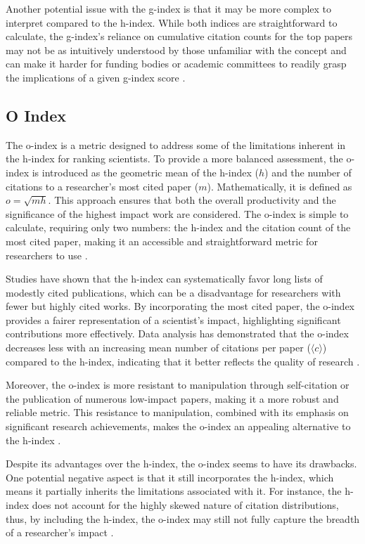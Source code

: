 Another potential issue with the g-index is that it may be more complex to
interpret compared to the h-index. While both indices are straightforward to
calculate, the g-index's reliance on cumulative citation counts for the top
papers may not be as intuitively understood by those unfamiliar with the
concept and can make it harder for funding bodies or academic committees to
readily grasp the implications of a given g-index score
\cite{egghe2008mathematical, egghe2006improvement}.

\subsection{O Index}
The o-index is a metric designed to address some of the limitations inherent in
the h-index for ranking scientists. To provide a more balanced assessment, the
o-index is introduced as the geometric mean of the h-index ($h$) and the number
of citations to a researcher's most cited paper ($m$). Mathematically, it is
defined as $o = \sqrt{mh}$. This approach ensures that both the overall
productivity and the significance of the highest impact work are considered.
The o-index is simple to calculate, requiring only two numbers: the h-index and
the citation count of the most cited paper, making it an accessible and
straightforward metric for researchers to use \cite{dorogovtsev2015ranking}.

Studies have shown that the h-index can systematically favor long lists of
modestly cited publications, which can be a disadvantage for researchers with
fewer but highly cited works. By incorporating the most cited paper, the
o-index provides a fairer representation of a scientist's impact, highlighting
significant contributions more effectively. Data analysis has demonstrated that
the o-index decreases less with an increasing mean number of citations per
paper ($\langle c \rangle$) compared to the h-index, indicating that it better
reflects the quality of research \cite{dorogovtsev2015ranking}.

Moreover, the o-index is more resistant to manipulation through self-citation
or the publication of numerous low-impact papers, making it a more robust and
reliable metric. This resistance to manipulation, combined with its emphasis on
significant research achievements, makes the o-index an appealing alternative
to the h-index \cite{dorogovtsev2015ranking}.

Despite its advantages over the h-index, the o-index seems to have its
drawbacks. One potential negative aspect is that it still incorporates the
h-index, which means it partially inherits the limitations associated with it.
For instance, the h-index does not account for the highly skewed nature of
citation distributions, thus, by including the h-index, the o-index may still
not fully capture the breadth of a researcher's impact
\cite{dorogovtsev2015ranking}.

